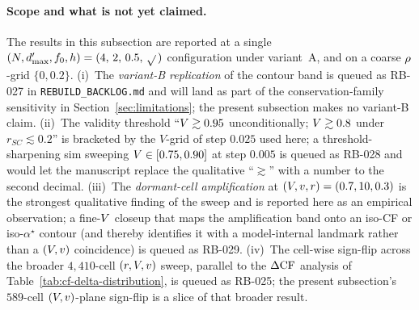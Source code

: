 \paragraph{Scope and what is not yet claimed.}
The results in this subsection are reported at a single $(N,
d'_{\max}, f_0, h) = (4,\,2,\,0.5,\,\sqrt{}\,)$ configuration
under variant~A, and on a coarse $\rho$-grid $\{0, 0.2\}$.
(i)~The \emph{variant-B replication} of the contour band is queued
as RB-027 in \texttt{REBUILD\_BACKLOG.md} and will land as part of
the conservation-family sensitivity in
Section~\ref{sec:limitations}; the present subsection makes no
variant-B claim. (ii)~The validity threshold ``$V \gtrsim
0.95$ unconditionally; $V \gtrsim 0.8$ under
$r_{SC} \lesssim 0.2$'' is bracketed by the $V$-grid of step
$0.025$ used here; a threshold-sharpening sim sweeping $V \in
[0.75, 0.90]$ at step $0.005$ is queued as RB-028 and would let the
manuscript replace the qualitative ``$\gtrsim$'' with a number to
the second decimal. (iii)~The \emph{dormant-cell amplification} at
$(V, v, r) = (0.7, 10, 0.3)$ is the strongest
qualitative finding of the sweep and is reported here as an
empirical observation; a fine-$V$ closeup that maps the
amplification band onto an iso-CF or iso-$\alpha^\star$ contour
(and thereby identifies it with a model-internal landmark rather
than a $(V, v)$ coincidence) is queued as RB-029.
(iv)~The cell-wise sign-flip across the broader $4{,}410$-cell
$(r, V, v)$ sweep, parallel to the $\Delta\mathrm{CF}$
analysis of Table~\ref{tab:cf-delta-distribution}, is queued as
RB-025; the present subsection's $589$-cell $(V, v)$-plane
sign-flip is a slice of that broader result.

